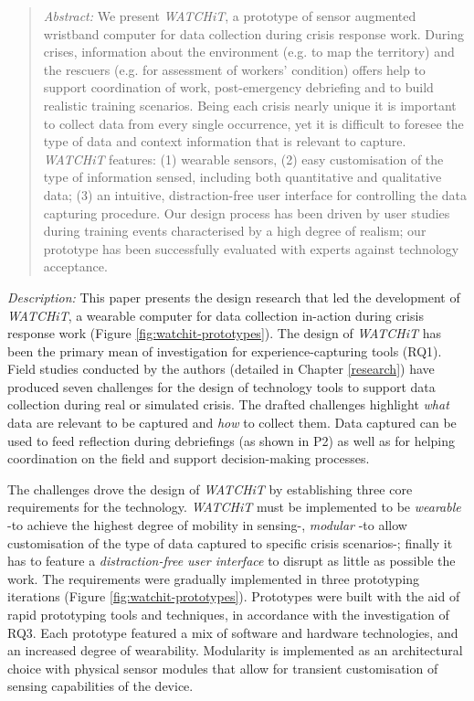 \begin{quote}
\emph{Abstract:} We present \emph{WATCHiT}, a prototype of sensor augmented wristband computer for data collection during crisis response work. During crises, information about the environment (e.g. to map the territory) and the rescuers (e.g. for assessment of workers' condition) offers help to support coordination of work, post-emergency debriefing and to build realistic training scenarios. Being each crisis nearly unique it is important to collect data from every single occurrence, yet it is difficult to foresee the type of data and context information that is relevant to capture. \emph{WATCHiT} features: (1) wearable sensors, (2) easy customisation of the type of information sensed, including both quantitative and qualitative data; (3) an intuitive, distraction-free user interface for controlling the data capturing procedure. Our design process has been driven by user studies during training events characterised by a high degree of realism; our prototype has been successfully evaluated with experts against technology acceptance. 
\end{quote}

\emph{Description:} This paper presents the design research that led the development of \emph{WATCHiT}, a wearable computer for data collection in-action during crisis response work (Figure \ref{fig:watchit-prototypes}). The design of \emph{WATCHiT} has been the primary mean of investigation for experience-capturing tools (RQ1). Field studies conducted by the authors (detailed in Chapter \ref{research}) have produced seven challenges for the design of technology tools to support data collection during real or simulated crisis. The drafted challenges highlight \emph{what} data are relevant to be captured and \emph{how} to collect them. Data captured can be used to feed reflection during debriefings (as shown in P2) as well as for helping coordination on the field and support decision-making processes.

The challenges drove the design of \emph{WATCHiT} by establishing three core requirements for the technology. \emph{WATCHiT} must be implemented to be \emph{wearable} -to achieve the highest degree of mobility in sensing-, \emph{modular} -to allow customisation of the type of data captured to specific crisis scenarios-; finally it has to feature a \emph{distraction-free user interface} to disrupt as little as possible the work. The requirements were gradually implemented in three prototyping iterations (Figure \ref{fig:watchit-prototypes}). Prototypes were built with the aid of rapid prototyping tools and techniques, in accordance with the investigation of RQ3.  Each prototype featured a mix of software and hardware technologies, and an increased degree of wearability. Modularity is implemented as an architectural choice with physical sensor modules that allow for transient customisation of sensing capabilities of the device.

